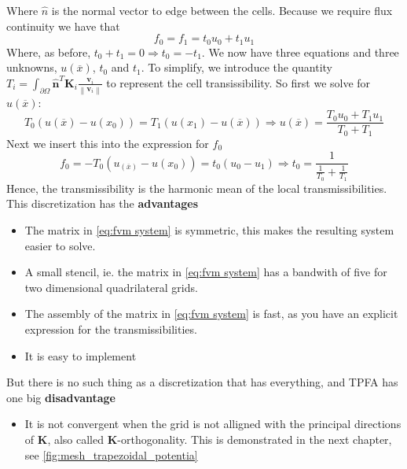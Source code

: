 \documentclass[../Main/main.tex]{subfiles}
\begin{document}
Where $\hat{n}$ is the normal vector to edge between the cells.
Because we require flux continuity we have that 
\begin{equation}
	f_0 = f_1 = t_0 u_0 + t_1 u_1
\end{equation}
Where, as before, $t_0 + t_1 = 0 \Rightarrow t_0 = -t_1$. We now have three equations and three unknowns, $u(\overline{x})$, $t_0$ and $t_1$. To simplify, we introduce the quantity $T_i = \int_{\partial \Omega} \hat{\pmb{n}}^T \pmb{K}_i  \frac{\pmb{v}_i}{\left \| \pmb{v}_i \right \|} $ to represent the cell transissibility. So first we solve for $u(\overline{x})$:
\begin{equation}
	T_0(u(\overline{x})-u(x_0)) = T_1(u(x_1)-u(\overline{x})) \Rightarrow u(\overline{x}) = \frac{T_0 u_0 + T_1 u_1}{T_0 + T_1}
\end{equation}
Next we insert this into the expression for $f_0$ 
\begin{equation}
	f_0 = -T_0(u_(\overline{x})-u(x_0)) = t_0(u_0 - u_1) \Rightarrow t_0 = \frac{1}{\frac{1}{T_0}+\frac{1}{T_1}}
\end{equation}
Hence, the transmissibility is the harmonic mean of the local transmissibilities. This discretization has the \textbf{advantages}
\begin{itemize}
	\item The matrix in \eqref{eq:fvm system} is symmetric, this makes the resulting system easier to solve.
	\item A small stencil, ie. the matrix in \eqref{eq:fvm system} has a bandwith of five for two dimensional quadrilateral grids.
	\item The assembly of the matrix in \eqref{eq:fvm system} is fast, as you have an explicit expression for the transmissibilities.
	\item It is easy to implement
\end{itemize}
But there is no such thing as a discretization that has everything, and TPFA has one big \textbf{disadvantage}
\begin{itemize}
	\item It is not convergent when the grid is not alligned with the principal directions of $\pmb{K}$, also called $\pmb{K}$-orthogonality. This is demonstrated in the next chapter, see \ref{fig:mesh_trapezoidal_potentia}
\end{itemize}
\end{document}
